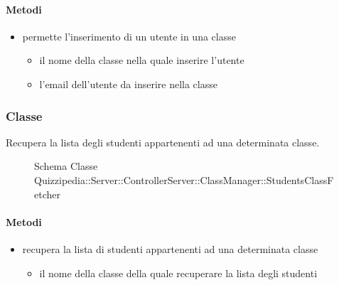 \paragraph{Metodi}
\begin{itemize}
\item {}
\newline
permette l'inserimento di un utente in una classe
\newline
{}
\newline
\begin{itemize}
\item {}
\newline
il nome della classe nella quale inserire l'utente
\item {}
\newline
l'email dell'utente da inserire nella classe
\end{itemize}
\end{itemize}
\subsubsection{Classe }
Recupera la lista degli studenti appartenenti ad una determinata classe.
\begin{figure}[H]
\centering
\noindent{}
\caption[Schema Classe StudentsClassFetcher]{Schema Classe Quizzipedia::Server::ControllerServer::ClassManager::StudentsClassFetcher}
\end{figure}
\paragraph{Metodi}
\begin{itemize}
\item {}
\newline
recupera la lista di studenti appartenenti ad una determinata classe
\newline
{}
\newline
\begin{itemize}
\item {}
\newline
il nome della classe della quale recuperare la lista degli studenti
\end{itemize}
\end{itemize}
